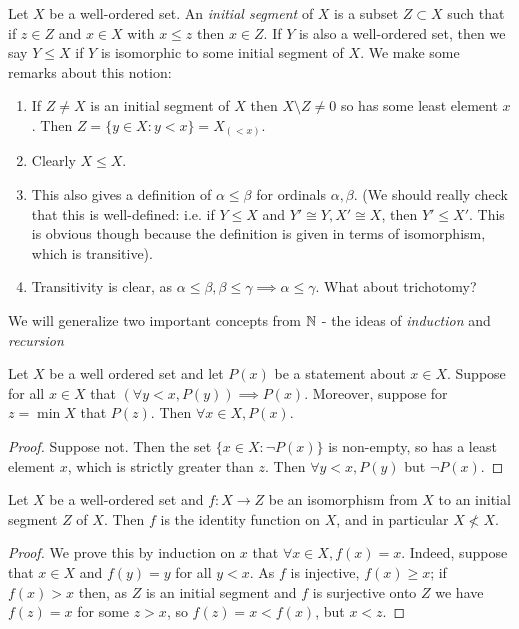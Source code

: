 \documentclass[10pt,a4paper]{article}
\begin{document}
Let $X$ be a well-ordered set. An \emph{initial segment} of $X$ is a subset $Z \subset X$ such that if $z \in Z$ and $x \in X$ with $x \leq z$ then $x \in Z$. If $Y$ is also a well-ordered set, then we say $Y \leq X$ if $Y$ is isomorphic to some initial segment of $X$. We make some remarks about this notion:
\begin{enumerate}
\item If $Z \neq X$ is an initial segment of $X$ then $X \setminus Z \neq 0$ so has some least element $x$. Then $Z = \{y \in X: y<x\} = X_{(<x)}$.
\item Clearly $X \leq X$.
\item This also gives a definition of $\alpha \leq \beta$ for ordinals $\alpha, \beta$. (We should really check that this is well-defined: i.e. if $Y \leq X$ and $Y' \cong Y, X' \cong X$, then $Y' \leq X'$. This is obvious though because the definition is given in terms of isomorphism, which is transitive).
\item Transitivity is clear, as $\alpha \leq\beta, \beta\leq \gamma \implies \alpha \leq \gamma$. What about trichotomy?
\end{enumerate}
We will generalize two important concepts from $\mathbb{N}$ - the ideas of \emph{induction} and \emph{recursion}
\begin{proposition}
Let $X$ be a well ordered set and let $P(x)$ be a statement about $x \in X$. Suppose for all $x \in X$ that $(\forall y < x, P(y)) \implies P(x)$. Moreover, suppose for $z = \min X$ that $P(z)$. Then $\forall x \in X, P(x)$.
\end{proposition}
\begin{proof}
Suppose not. Then the set $\{x \in X: \neg P(x)\}$ is non-empty, so has a least element $x$, which is strictly greater than $z$. Then $\forall y < x, P(y)$ but $\neg P(x)$. \contr
\end{proof}
\begin{proposition}
Let $X$ be a well-ordered set and $f:X \to Z$ be an isomorphism from $X$ to an initial segment $Z$ of $X$. Then $f$ is the identity function on $X$, and in particular $X \nless X$.
\end{proposition}
\begin{proof}
We prove this by induction on $x$ that $\forall x \in X, f(x)=x$. Indeed, suppose that $x \in X$ and $f(y)=y$ for all $y < x$. As $f$ is injective, $f(x) \geq x$; if $f(x)>x$ then, as $Z$ is an initial segment and $f$ is surjective onto $Z$ we have $f(z) = x$ for some $z > x$, so $f(z) = x < f(x)$, but $x < z$. \contr
\end{proof}
\end{document}
